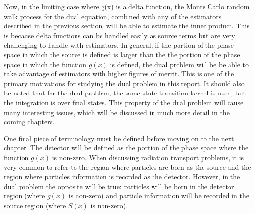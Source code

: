 Now, in the limiting case where g(x) is a delta function, the Monte Carlo
random walk process for the dual equation, combined with any of the estimators 
described in the previous section, will be able to estimate the inner product. 
This is because delta functions can be handled easily as source terms but
are very challenging to handle with estimators. In general, if the portion of 
the phase space in which the source is defined is larger than the the portion 
of the phase space in which the function $g(x)$ is defined, the dual problem
will be be able to take advantage of estimators with higher figures of merrit. 
This is one of the primary motivations for studying the dual problem in this
report. It should also be noted that for the dual problem, the same state 
transition kernel is used, but the integration is over final states. This 
property of the dual problem will cause many interesting issues, which will be 
discussed in much more detail in the coming chapters.

One final piece of terminology must be defined before moving on to the next 
chapter. The detector will be defined as the portion of the phase space where
the function $g(x)$ is non-zero. When discussing radiation transport problems,
it is very common to refer to the region where particles are born as the source
and the region where particles information is recorded as the detector. However,
in the dual problem the opposite will be true; particles will be born in the
detector region (where $g(x)$ is non-zero) and particle information will be 
recorded in the source region (where $S(x)$ is non-zero).
